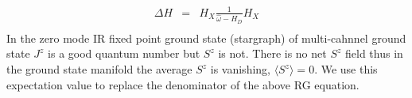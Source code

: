 \documentclass[reprint,prb,superscriptaddress]{revtex4-1}
\begin{document}
\begin{eqnarray}
\Delta H &=& H_X \frac{1}{\hat{\omega}-H_D} H_X \nonumber\\ 
\end{eqnarray}
In the zero mode IR fixed point ground state (stargraph) of multi-cahnnel ground state $J^z$ is a good quantum number but $S^z$ is not. There is no net $S^z$ field thus in the ground state manifold the average $S^z$ is vanishing, $\langle S^z \rangle=0$. We use this expectation value to replace the denominator of the above RG equation.
\end{document}

